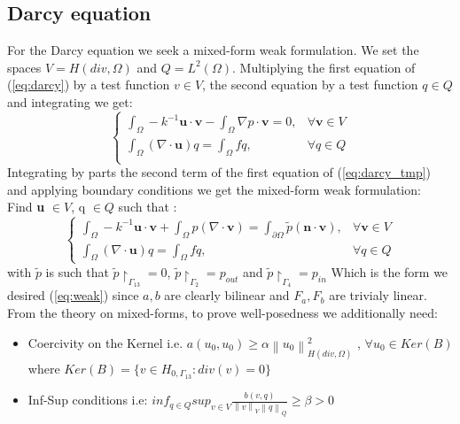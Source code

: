 \documentclass[conference]{IEEEtran}
\newcommand{\norm}[1]{\left\lVert#1\right\rVert}
\begin{document}
\subsection{Darcy equation}
For the Darcy equation we seek a mixed-form weak formulation. We set the spaces
$V=H(div,\Omega)$ and $Q=L^2(\Omega)$. Multiplying the first equation of (\ref{eq:darcy}) by a test function $v\in V$, the second equation by a test function $q\in Q$ and integrating we get:
\begin{equation}
    \begin{cases}
      \int_\Omega-k^{-1}\textbf{u}\cdot \textbf{v} 
      -\int_\Omega \nabla p \cdot \textbf{v} = 0 , & \forall \textbf{v} \in V  \\
      \int_\Omega (\nabla \cdot \textbf{u})q = \int_\Omega fq, & \forall q \in Q \\
    \end{cases}
    \label{eq:darcy_tmp}
\end{equation}
Integrating by parts the second term of the first equation of (\ref{eq:darcy_tmp}) and applying boundary conditions we get the mixed-form weak formulation:\\
Find \textbf{u} $\in V$, q $\in Q$ such that  :
\begin{equation}
    \begin{cases}
      \int_\Omega -k^{-1}\textbf{u}\cdot \textbf{v} + \int_\Omega  p (\nabla\cdot \textbf{v})
      = \int_{\partial\Omega}  \tilde{p} (\textbf{n}\cdot \textbf{v})  , & \forall \textbf{v} \in V  \\
      \int_\Omega (\nabla \cdot \textbf{u})q = \int_\Omega fq, & \forall q \in Q 
    \end{cases}
    \label{eq:darcy_weak}
\end{equation}
with $\tilde{p}$ is such that $\tilde{p}{\restriction}_{\Gamma_{13}} = 0 $, $\tilde{p}{\restriction}_{\Gamma_2} = p_{out} $ and $\tilde{p}{\restriction}_{\Gamma_4} = p_{in} $
Which is the form we desired (\ref{eq:weak}) since $a,b$ are clearly bilinear and $F_a,F_b$ are trivialy linear. \\
From the theory on mixed-forms, to prove well-posedness we additionally need:
\begin{itemize}
\item Coercivity on the Kernel i.e. $a(u_0,u_0) \geq \alpha \norm{u_0}_{H(div,\Omega)}^2$ , $\forall u_0 \in Ker(B)$ where $Ker(B)=\{v \in H_{0,\Gamma_{13}} : div(v)=0 \}$
\item Inf-Sup conditions i.e: $ inf_{q\in Q} sup_{v\in V} \frac{ b(v,q) }{ \norm{v}_V \norm{q}_Q } \geq \beta >0   $ 
\end{itemize}
\end{document}
